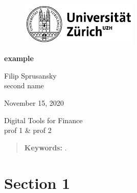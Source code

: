 \documentclass[a4paper,12pt]{article}
\begin{document}
	
	\begin{titlepage}
		\centering
		\begin{figure}[!h]
			\centering
			\includegraphics[width=0.5\textwidth]{UZH}
		\end{figure}
		\Large{\textbf{example}\\}

		
		\vfill 
		
		\large{Filip Sprusansky \\ 
				second name \\}
		
		\vfill
			
		\large{November 15, 2020}
		
		\vfill
		\vfill
	
		\large{Digital Tools for Finance \\prof 1 \& prof 2 \\ }
	
		\vfill
		\begin{abstract}
		\noindent
			\blindtext
			
			\vspace{3mm}
			
			\textbf{Keywords:} .
		\end{abstract}
		
		
	\end{titlepage}
	
	
	\clearpage
	\tableofcontents
	
	\clearpage
	\listoffigures
	
	\clearpage
	\listoftables
	\clearpage	
	
	\section{Section 1}
    \cite{Busse}
    	
	
	\clearpage\thispagestyle{empty}\addtocounter{page}{-1}\mbox{}
	
	
	
	
\end{document}
